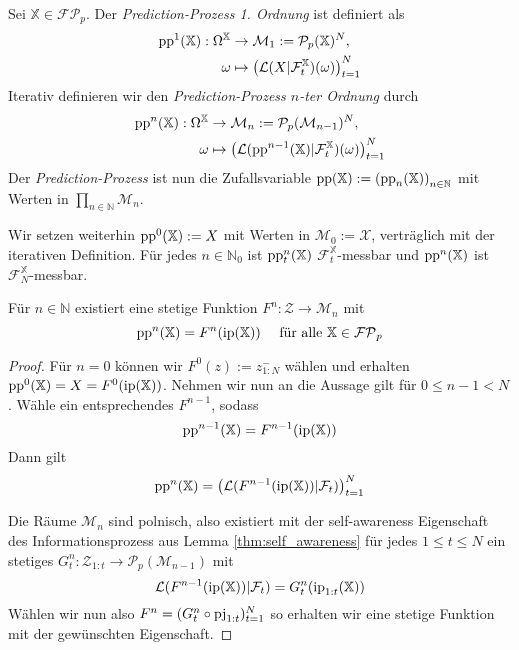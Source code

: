     \begin{definition}
        Sei $\mathbb{X} \in \mathcal{FP}_p$. Der \emph{Prediction-Prozess 1. Ordnung} ist definiert als
        \begin{align*}
            \operatorname{pp}^1(\mathbb{X}): \Omega^\mathbb{X} &\rightarrow \mathcal{M}_1 := \mathcal{P}_p(\mathbb{X})^N, \\
            \omega &\mapsto \left(\mathcal{L}(X \vert \mathcal{F}_t^\mathbb{X})(\omega)\right)_{t=1}^{N}
        \end{align*}
        Iterativ definieren wir den \emph{Prediction-Prozess $n$-ter Ordnung} durch
        \begin{align*}
            \operatorname{pp}^n(\mathbb{X}): \Omega^\mathbb{X} &\rightarrow \mathcal{M}_n := \mathcal{P}_p(\mathcal{M}_{n-1})^N, \\
            \omega &\mapsto \left(\mathcal{L}(\operatorname{pp}^{n-1}(\mathbb{X}) \vert \mathcal{F}_t^\mathbb{X})(\omega)\right)_{t=1}^{N}
        \end{align*}
        Der \emph{Prediction-Prozess} ist nun die Zufallsvariable $\operatorname{pp}(\mathbb{X}) := \left(\operatorname{pp}_n(\mathbb{X})\right)_{n\in\mathbb{N}}$ mit Werten in $\prod_{n\in\mathbb{N}} \mathcal{M}_n$.
    \end{definition}
    Wir setzen weiterhin $\operatorname{pp}^0(\mathbb{X}):=X$ mit Werten in $\mathcal{M}_0:=\mathcal{X}$, verträglich mit der iterativen Definition. Für jedes $n \in \mathbb{N}_0$ ist $\operatorname{pp}^n_t(\mathbb{X})$ $\mathcal{F}_t^\mathbb{X}$-messbar und $\operatorname{pp}^n(\mathbb{X})$ ist $\mathcal{F}_N^\mathbb{X}$-messbar.
    \begin{lemma}\label{thm:pp_from_ip}
        Für $n \in \mathbb{N}$ existiert eine stetige Funktion $F^n: \mathcal{Z} \rightarrow \mathcal{M}_n$ mit 
        $$\operatorname{pp}^n(\mathbb{X}) = F^{n}(\operatorname{ip}(\mathbb{X})) \quad \text{ für alle } \mathbb{X} \in \mathcal{FP}_p$$
    \end{lemma}
    \begin{proof}
        Für $n=0$ können wir $F^0(z) := z^-_{1:N}$ wählen und erhalten $\operatorname{pp}^0(\mathbb{X}) = X = F^0(\operatorname{ip}(\mathbb{X}))$. Nehmen wir nun an die Aussage gilt für $0\leq n-1 < N$. Wähle ein entsprechendes $F^{n-1}$, sodass 
        $$\operatorname{pp}^{n-1}(\mathbb{X}) = F^{n-1}(\operatorname{ip}(\mathbb{X}))$$
        Dann gilt 
        $$\operatorname{pp}^n(\mathbb{X}) = \left( \mathcal{L}(F^{n-1}(\operatorname{ip}(\mathbb{X})) \vert \mathcal{F}_t) \right)_{t=1}^{N}$$
        
        Die Räume $\mathcal{M}_n$ sind polnisch, also existiert mit der self-awareness Eigenschaft des Informationsprozess aus Lemma \ref{thm:self_awareness} für jedes $1\leq t \leq N$ ein stetiges $G_t^n:\mathcal{Z}_{1:t} \rightarrow \mathcal{P}_p(\mathcal{M}_{n-1})$ mit 
        $$\mathcal{L}(F^{n-1}(\operatorname{ip}(\mathbb{X})) \vert \mathcal{F}_t) = G_t^n(\operatorname{ip}_{1:t}(\mathbb{X}))$$
        Wählen wir nun also $F^n=(G_t^n\circ \operatorname{pj}_{1:t})_{t=1}^N$ so erhalten wir eine stetige Funktion mit der gewünschten Eigenschaft.
    \end{proof}

